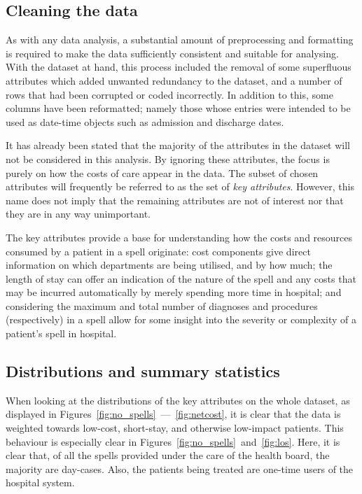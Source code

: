 \subsection{Cleaning the data}\label{subsec:formatting}

As with any data analysis, a substantial amount of preprocessing and formatting
is required to make the data sufficiently consistent and suitable for analysing.
With the dataset at hand, this process included the removal of some superfluous
attributes which added unwanted redundancy to the dataset, and a number of rows
that had been corrupted or coded incorrectly. In addition to this, some columns
have been reformatted; namely those whose entries were intended to be used as
date-time objects such as admission and discharge dates.

It has already been stated that the majority of the attributes in the dataset
will not be considered in this analysis. By ignoring these attributes, the focus
is purely on how the costs of care appear in the data. The subset of chosen
attributes will frequently be referred to as the set of \emph{key attributes}.
However, this name does not imply that the remaining attributes are not of
interest nor that they are in any way unimportant.

The key attributes provide a base for understanding how the costs and resources
consumed by a patient in a spell originate: cost components give direct
information on which departments are being utilised, and by how much; the length
of stay can offer an indication of the nature of the spell and any costs that
may be incurred automatically by merely spending more time in hospital; and
considering the maximum and total number of diagnoses and procedures
(respectively) in a spell allow for some insight into the severity or complexity
of a patient's spell in hospital.

\subsection{Distributions and summary statistics}%
\label{subsec:distributions_statistics}
\graphicspath{{chapters/data/paper/img/overview/}}

When looking at the distributions of the key attributes on the whole dataset, as
displayed in Figures~\ref{fig:no_spells}~---~\ref{fig:netcost}, it is clear that
the data is weighted towards low-cost, short-stay, and otherwise low-impact
patients. This behaviour is especially clear in
Figures~\ref{fig:no_spells}~and~\ref{fig:los}. Here, it is clear that, of all
the spells provided under the care of the health board, the majority are
day-cases. Also, the patients being treated are one-time users of the hospital
system.

